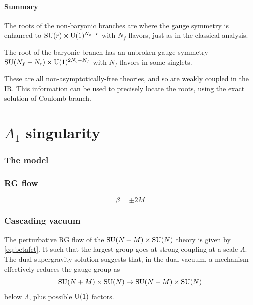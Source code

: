     \subsection{Summary}

        The roots of the non-baryonic branches are where the gauge symmetry is enhanced to $\text{SU}(r)\times\text{U}(1)^{N_c-r}$ with $N_f$ flavors, just as in the classical analysis.

        The root of the baryonic branch has an unbroken gauge symmetry $\text{SU}(N_f-N_c)\times\text{U}(1)^{2N_c-N_f}$ with $N_f$ flavors in some singlets.

        These are all non-asymptotically-free theories, and so are weakly coupled in the IR. This information can be used to precisely locate the roots, using the exact solution of Coulomb branch.


\part{$A_1$ singularity}

\section{The model}

\section{RG flow}

    \begin{equation}
        \beta=\pm 2M\label{eq:betafct}
    \end{equation}

\section{Cascading vacuum}

    The perturbative RG flow of the $\text{SU}(N+M)\times\text{SU}(N)$ theory is given by \eqref{eq:betafct}. It such that the largest group goes at strong coupling at a scale $\Lambda$. The dual supergravity solution suggests that, in the dual vacuum, a mechanism effectively reduces the gauge group as
    \begin{equation}
        \text{SU}(N+M)\times\text{SU}(N)\to\text{SU}(N-M)\times\text{SU}(N)\label{eq:gaugegroupereduction}
    \end{equation}
    below $\Lambda$, plus possible $\text{U}(1)$ factors. 
    
